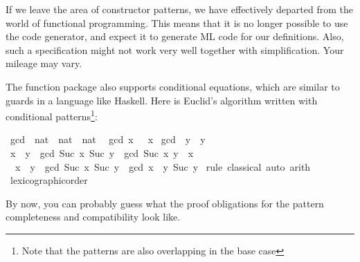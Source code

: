 \begin{isabellebody}
\begin{isamarkuptext}
  If we leave the area of constructor
  patterns, we have effectively departed from the world of functional
  programming. This means that it is no longer possible to use the
  code generator, and expect it to generate ML code for our
  definitions. Also, such a specification might not work very well together with
  simplification. Your mileage may vary.%
\end{isamarkuptext}%
\isamarkuptrue%
%
\isamarkuptrue%
%
\begin{isamarkuptext}%
The function package also supports conditional equations, which are
  similar to guards in a language like Haskell. Here is Euclid's
  algorithm written with conditional patterns\footnote{Note that the
  patterns are also overlapping in the base case}:%
\end{isamarkuptext}%
\isamarkuptrue%
\isamarkupfalse%
\ gcd\ {\isacharcolon}{\isacharcolon}\ {\isachardoublequoteopen}nat\ {\isasymRightarrow}\ nat\ {\isasymRightarrow}\ nat{\isachardoublequoteclose}\isanewline
{}\isanewline
\ \ {\isachardoublequoteopen}gcd\ x\ {}\ {\isacharequal}\ x{\isachardoublequoteclose}\isanewline
{\isacharbar}\ {\isachardoublequoteopen}gcd\ {}\ y\ {\isacharequal}\ y{\isachardoublequoteclose}\isanewline
{\isacharbar}\ {\isachardoublequoteopen}x\ {\isacharless}\ y\ {\isasymLongrightarrow}\ gcd\ {\isacharparenleft}Suc\ x{\isacharparenright}\ {\isacharparenleft}Suc\ y{\isacharparenright}\ {\isacharequal}\ gcd\ {\isacharparenleft}Suc\ x{\isacharparenright}\ {\isacharparenleft}y\ {\isacharminus}\ x{\isacharparenright}{\isachardoublequoteclose}\isanewline
{\isacharbar}\ {\isachardoublequoteopen}{\isasymnot}\ x\ {\isacharless}\ y\ {\isasymLongrightarrow}\ gcd\ {\isacharparenleft}Suc\ x{\isacharparenright}\ {\isacharparenleft}Suc\ y{\isacharparenright}\ {\isacharequal}\ gcd\ {\isacharparenleft}x\ {\isacharminus}\ y{\isacharparenright}\ {\isacharparenleft}Suc\ y{\isacharparenright}{\isachardoublequoteclose}\isanewline
%
\isadelimproof
%
\endisadelimproof
%
\isatagproof
{}\isamarkupfalse%
\ {\isacharparenleft}rule\ classical{\isacharcomma}\ auto{\isacharcomma}\ arith{\isacharparenright}%
\endisatagproof
{\isafoldproof}%
%
\isadelimproof
\isanewline
%
\endisadelimproof
{}\isamarkupfalse%
%
\isadelimproof
\ %
\endisadelimproof
%
\isatagproof
{}\isamarkupfalse%
\ lexicographic{\isacharunderscore}order%
\endisatagproof
{\isafoldproof}%
%
\isadelimproof
%
\endisadelimproof
%
\begin{isamarkuptext}%
By now, you can probably guess what the proof obligations for the
  pattern completeness and compatibility look like. 


\end{isamarkuptext}
\end{isabellebody}
